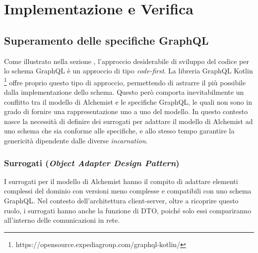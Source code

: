 \chapter{Implementazione e Verifica}\label{chap:implementation}

\section{Superamento delle specifiche GraphQL}\label{sec:overcoming-gql-specs}
Come illustrato nella sezione , l'approccio desiderabile di sviluppo del codice per lo schema GraphQL è un approccio di
tipo \textit{code-first}. La libreria GraphQL Kotlin \footnote{https://opensource.expediagroup.com/graphql-kotlin/} offre proprio questo tipo di
approccio, permettendo di astrarre il più possibile dalla implementazione dello schema. Questo però comporta inevitabilmente un conflitto tra il modello
di Alchemist e le specifiche GraphQL, le quali non sono in grado di fornire una rappresentazione uno a uno del modello.
In questo contesto nasce la necessità di definire dei surrogati per adattare il modello di Alchemist ad uno schema che sia conforme alle specifiche,
e allo stesso tempo garantire la genericità dipendente dalle diverse \textit{incarnation}.

\subsection{Surrogati (\textit{Object Adapter Design Pattern})}\label{ssec:surrogates}
I surrogati per il modello di Alchemist hanno il compito di adattare elementi complessi del dominio con versioni meno complesse e compatibili
con uno schema GraphQL. Nel contesto dell'architettura client-server, oltre a ricoprire questo ruolo,
i surrogati hanno anche la funzione di \ac{DTO}, poiché solo essi compariranno all'interno delle comunicazioni in rete.

